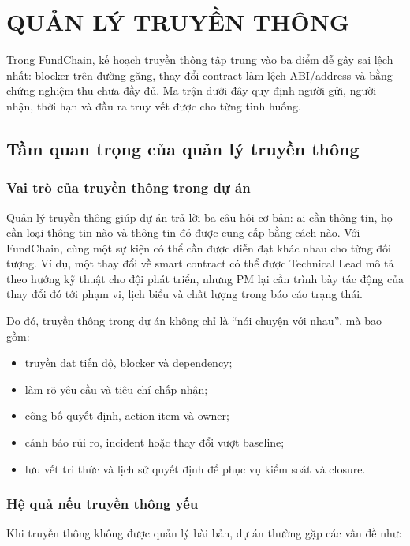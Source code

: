 \chapter{QUẢN LÝ TRUYỀN THÔNG}

Trong FundChain, kế hoạch truyền thông tập trung vào ba điểm dễ gây sai lệch nhất: blocker trên đường găng, thay đổi contract làm lệch ABI/address và bằng chứng nghiệm thu chưa đầy đủ. Ma trận dưới đây quy định người gửi, người nhận, thời hạn và đầu ra truy vết được cho từng tình huống.

\iffalse
\section{Tầm quan trọng của quản lý truyền thông}

\subsection{Vai trò của truyền thông trong dự án}

Quản lý truyền thông giúp dự án trả lời ba câu hỏi cơ bản: ai cần thông tin, họ cần loại thông tin nào và thông tin đó được cung cấp bằng cách nào. Với FundChain, cùng một sự kiện có thể cần được diễn đạt khác nhau cho từng đối tượng. Ví dụ, một thay đổi về smart contract có thể được Technical Lead mô tả theo hướng kỹ thuật cho đội phát triển, nhưng PM lại cần trình bày tác động của thay đổi đó tới phạm vi, lịch biểu và chất lượng trong báo cáo trạng thái.

Do đó, truyền thông trong dự án không chỉ là ``nói chuyện với nhau'', mà bao gồm:

\begin{itemize}
  \item truyền đạt tiến độ, blocker và dependency;
  \item làm rõ yêu cầu và tiêu chí chấp nhận;
  \item công bố quyết định, action item và owner;
  \item cảnh báo rủi ro, incident hoặc thay đổi vượt baseline;
  \item lưu vết tri thức và lịch sử quyết định để phục vụ kiểm soát và closure.
\end{itemize}

\subsection{Hệ quả nếu truyền thông yếu}

Khi truyền thông không được quản lý bài bản, dự án thường gặp các vấn đề như:

